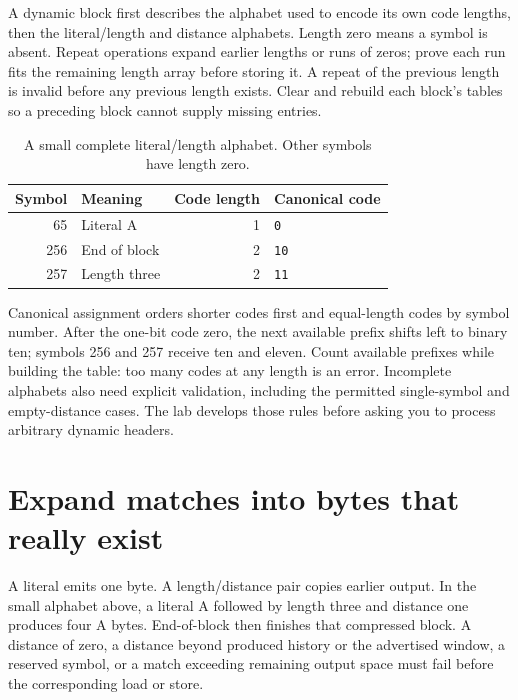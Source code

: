 A dynamic block first describes the alphabet used to encode its own code
lengths, then the literal/length and distance alphabets. Length zero means a
symbol is absent. Repeat operations expand earlier lengths or runs of zeros;
prove each run fits the remaining length array before storing it. A repeat of
the previous length is invalid before any previous length exists. Clear and
rebuild each block's tables so a preceding block cannot supply missing entries.

\begin{table}[!ht]
  \centering
  \begin{tabular}{r l r l}
    \toprule
    Symbol & Meaning      & Code length & Canonical code \\
    \midrule
    65     & Literal A    & 1           & \texttt{0}     \\
    256    & End of block & 2           & \texttt{10}    \\
    257    & Length three & 2           & \texttt{11}    \\
    \bottomrule
  \end{tabular}
  \caption{A small complete literal/length alphabet. Other symbols have length zero.}
\end{table}

Canonical assignment orders shorter codes first and equal-length codes by
symbol number. After the one-bit code zero, the next available prefix shifts
left to binary ten; symbols 256 and 257 receive ten and eleven. Count available
prefixes while building the table: too many codes at any length is an error.
Incomplete alphabets also need explicit validation, including the permitted
single-symbol and empty-distance cases. The lab develops those rules before
asking you to process arbitrary dynamic headers.

\section{Expand matches into bytes that really exist}

A literal emits one byte. A length/distance pair copies earlier output. In the
small alphabet above, a literal A followed by length three and distance one
produces four A bytes. End-of-block then finishes that compressed block.
A distance of zero, a distance beyond produced history or the advertised window,
a reserved symbol, or a match exceeding remaining output space must fail before
the corresponding load or store.

